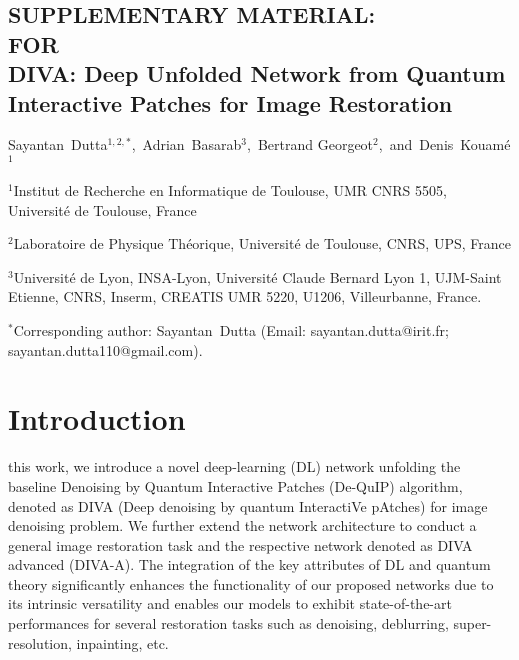\documentclass[10pt,journal,compsoc]{IEEEtran}
\begin{document}
\begin{onecolumn}



\begin{center}


\section*{\Huge{SUPPLEMENTARY MATERIAL:}\\
\Large{FOR}\\
\LARGE{DIVA: Deep Unfolded Network from Quantum Interactive Patches for Image Restoration}
}

\vspace*{5mm}

{Sayantan~Dutta$^{1,2,\ast}$,~Adrian~Basarab$^{3}$,~Bertrand Georgeot$^{2}$,~and~Denis~Kouam\'e$^{1}$}


\vspace{.2cm}
$^{1}$Institut de Recherche en Informatique de Toulouse, UMR CNRS 5505, Universit\'e de Toulouse, France

\vspace{.1cm}
$^{2}$Laboratoire de Physique Th\'eorique, Universit\'e de Toulouse, CNRS, UPS, France

\vspace{.1cm}
$^{3}$Universit\'e de Lyon, INSA-Lyon, Universit\'e Claude Bernard Lyon 1, UJM-Saint Etienne, CNRS, Inserm, CREATIS UMR 5220, U1206, Villeurbanne, France.


$^{\ast}$Corresponding author: Sayantan~Dutta (Email: sayantan.dutta@irit.fr; sayantan.dutta110@gmail.com).

\vspace*{5mm}
\end{center}


\end{onecolumn}







\section{Introduction}
\label{sec:intro_supp}


 this work, we introduce a novel deep-learning (DL) network unfolding the baseline Denoising by Quantum Interactive Patches (De-QuIP) \cite{dutta2021image, dutta2022novel} algorithm, denoted as DIVA (Deep denoising by quantum InteractiVe pAtches) for image denoising problem. We further extend the network architecture to conduct a general image restoration task and the respective network denoted as DIVA advanced (DIVA-A).
The integration of the key attributes of DL and quantum theory significantly enhances the functionality of our proposed networks due to its intrinsic versatility and enables our models to exhibit state-of-the-art performances for several restoration tasks such as denoising, deblurring, super-resolution, inpainting, etc.
\end{document}
